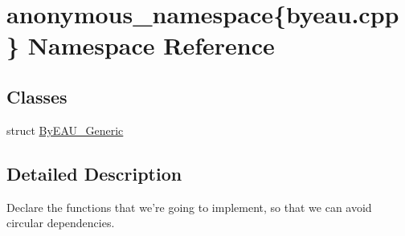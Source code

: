 \hypertarget{namespaceanonymous__namespace_02byeau_8cpp_03}{\section{anonymous\-\_\-namespace\{byeau.\-cpp\} Namespace Reference}
\label{namespaceanonymous__namespace_02byeau_8cpp_03}
}
\subsection*{Classes}
\begin{DoxyCompactItemize}
\item 
struct \hyperlink{structanonymous__namespace_02byeau_8cpp_03_1_1ByEAU__Generic}{By\-E\-A\-U\-\_\-\-Generic}
\end{DoxyCompactItemize}


\subsection{Detailed Description}
Declare the functions that we're going to implement, so that we can avoid circular dependencies. 